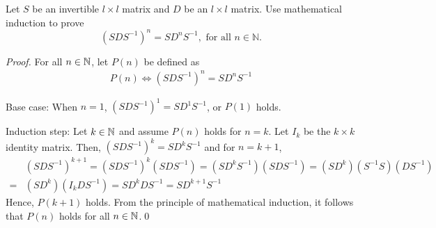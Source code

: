 \begin{question}
\normalfont
Let $S$ be an invertible $l \times l$ matrix and $D$ be an $l \times l$ matrix. Use mathematical induction to prove 
$$
\left(S D S^{-1} \right)^n = S D^n S^{-1}, \text{ for all } n \in \mathbb{N}.
$$ 
\end{question}

\begin{proof}
    \renewcommand{\qedsymbol}{$\blacksquare$}
    For all $n\in\mathbb N$, let $P(n)$ be defined as
    \[
        \begin{aligned}
            P(n)\iff(SDS^{-1})^n=SD^nS^{-1}
        \end{aligned}
    \] 
    
    Base case: When $n=1$, $(SDS^{-1})^1=SD^1S^{-1}$, or $P(1)$ holds.

    Induction step: Let $k\in\mathbb N$ and assume $P(n)$ holds for $n=k$.
    Let $I_k$ be the $k\times k$ identity matrix.
    Then, $(SDS^{-1})^k=SD^kS^{-1}$ and for $n=k+1$, 
    \[
        \begin{aligned}
            &(SDS^{-1})^{k+1}
            =(SDS^{-1})^k(SDS^{-1})
            =(SD^kS^{-1})(SDS^{-1})
            =(SD^k)(S^{-1}S)(DS^{-1})\\
            =&(SD^k)(I_kDS^{-1})
            =SD^kDS^{-1}
            =SD^{k+1}S^{-1}
        \end{aligned}
    \]
    Hence, $P(k+1)$ holds. From the principle of mathematical induction, it follows that $P(n)$ holds for all $n\in\mathbb N$.\qed
    \renewcommand{\qedsymbol}{}
\end{proof}